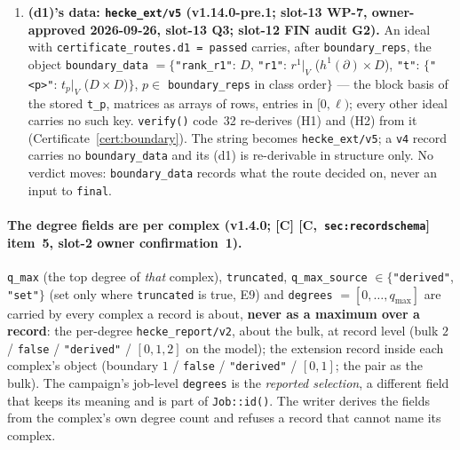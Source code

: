 \documentclass[11pt]{article}
\theoremstyle{remark}
\newcommand{\HA}[1]{[C,~\texttt{#1}]}      %
\begin{document}
\begin{enumerate}[label=(\alph*)]
  \texttt{generators\_certified}; \texttt{certificate} may be \texttt{"dickson"} or \texttt{"boundary"}.
  The routes run on the unsplit record only (a per-sign ideal carries \texttt{not\_run}, as for (b) and
  (c)), at $\ell\ge5$, $n$ even, and only where (a)--(c) did not pass. \texttt{verify()} refuses (code~30)
  a value outside the lists, a route on the wrong group or sign, \texttt{passed} disagreeing with the
  verdict's input, \texttt{not\_applicable:u\_ell} disagreeing with $\ell\in$ \texttt{operator\_primes},
  \texttt{boundary\_reps} $\ne R(\ell)$ where (d1) reached them, a certificate name the routes do not
  carry; and (code~31) a (d0) that does not re-derive from the stored $t_p$. The string becomes
  \texttt{hecke\_ext/v4}; a \texttt{v3} record carries none of these keys, and its \texttt{final} is the
  (a)--(c) verdict. The published \texttt{v3} campaign sets (\texttt{ext\_first}, \texttt{ext\_u691}) are
  not re-emitted.
\item \textbf{(d1)'s data: \texttt{hecke\_ext/v5} (v1.14.0-pre.1; slot-13 WP-7, owner-approved 2026-09-26,
  slot-13 Q3; slot-12 FIN audit G2).} An ideal with \texttt{certificate\_routes.d1 = passed} carries, after
  \texttt{boundary\_reps}, the object \texttt{boundary\_data} $=\{$\texttt{"rank\_r1"}: $D$, \texttt{"r1"}:
  $r^1|_V$ ($h^1(\partial)\times D$), \texttt{"t"}: $\{$\texttt{"<p>"}: $t_p|_V$ ($D\times D$)$\}$, $p\in$
  \texttt{boundary\_reps} in class order$\}$ --- the block basis of the stored \texttt{t\_p}, matrices as arrays
  of rows, entries in $[0,\ell)$; every other ideal carries no such key. \texttt{verify()} code~32 re-derives
  (H1) and (H2) from it (Certificate~\ref{cert:boundary}). The string becomes \texttt{hecke\_ext/v5}; a
  \texttt{v4} record carries no \texttt{boundary\_data} and its (d1) is re-derivable in structure only. No
  verdict moves: \texttt{boundary\_data} records what the route decided on, never an input to
  \texttt{final}.
\end{enumerate}

\paragraph{The degree fields are per complex (v1.4.0; [C] \HA{sec:recordschema} item~5,
slot-2 owner confirmation~1).} \texttt{q\_max} (the top degree of \emph{that} complex),
\texttt{truncated}, \texttt{q\_max\_source} $\in\{$\texttt{"derived"}, \texttt{"set"}$\}$ (set
only where \texttt{truncated} is true, E9) and \texttt{degrees} $=[0,\dots,q_{\max}]$ are
carried by every complex a record is about, \textbf{never as a maximum over a record}: the
per-degree \texttt{hecke\_report/v2}, about the bulk, at record level (bulk $2$ /
\texttt{false} / \texttt{"derived"} / $[0,1,2]$ on the model); the extension record inside each
complex's object (boundary $1$ / \texttt{false} / \texttt{"derived"} / $[0,1]$; the pair as the
bulk). The campaign's job-level \texttt{degrees} is the \emph{reported selection}, a different
field that keeps its meaning and is part of \texttt{Job::id()}. The writer derives the fields
from the complex's own degree count and refuses a record that cannot name its complex.
\end{document}
